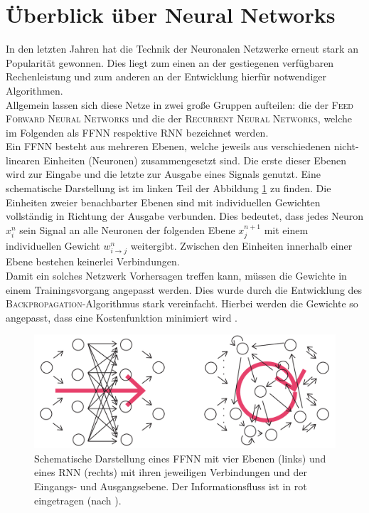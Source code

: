 \section{Überblick über Neural Networks}
In den letzten Jahren hat die Technik der Neuronalen Netzwerke erneut stark an Popularität gewonnen. Dies liegt zum einen an der gestiegenen verfügbaren Rechenleistung und zum anderen an der Entwicklung hierfür notwendiger Algorithmen.\\
Allgemein lassen sich diese Netze in zwei große Gruppen aufteilen: die der \textsc{Feed Forward Neural Networks} und die der \textsc{Recurrent Neural Networks}, welche im Folgenden als \textsc{FFNN} respektive \textsc{RNN} bezeichnet werden.\\

Ein \textsc{FFNN} besteht aus mehreren Ebenen, welche jeweils aus verschiedenen nicht-linearen Einheiten (Neuronen) zusammengesetzt sind. Die erste dieser Ebenen wird zur Eingabe und die letzte zur Ausgabe eines Signals genutzt. Eine schematische Darstellung ist im linken Teil der Abbildung \ref{fig:ffnn_rnn_structure} zu finden. Die Einheiten zweier benachbarter Ebenen sind mit individuellen Gewichten vollständig in Richtung der Ausgabe verbunden. Dies bedeutet, dass jedes Neuron $x^n_i$ sein Signal an alle Neuronen der folgenden Ebene $x^{n+1}_j$ mit einem individuellen Gewicht $w^n_{i \rightarrow j}$ weitergibt. Zwischen den Einheiten innerhalb einer Ebene bestehen keinerlei Verbindungen.\\
Damit ein solches Netzwerk Vorhersagen treffen kann, müssen die Gewichte in einem Trainingsvorgang angepasst werden. Dies wurde durch die Entwicklung des \textsc{Backpropagation}-Algorithmus stark vereinfacht. Hierbei werden die Gewichte so angepasst, dass eine Kostenfunktion minimiert wird \cite[S. 225-290]{bishop}.\\

\begin{figure}[H]
    \centering
    \includegraphics[width = 0.9 \textwidth]{figures/ffnn_rnn_structure(new).pdf}
    \caption{Schematische Darstellung eines \textsc{FFNN} mit vier Ebenen (links) und eines \textsc{RNN} (rechts) mit ihren jeweiligen Verbindungen und der Eingangs- und Ausgangsebene. Der Informationsfluss ist in rot eingetragen (nach \citep{jeagerTut2002}).}
    \label{fig:ffnn_rnn_structure}
\end{figure}

